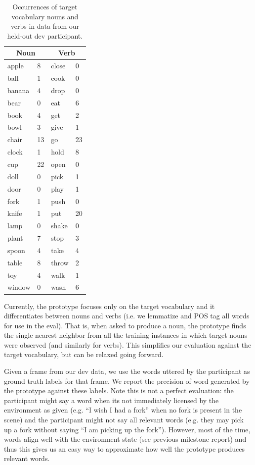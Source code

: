 \documentclass[11pt]{article}
\begin{document}
\begin{table}[ht!]
\centering
\begin{tabular}{|ll|ll|}
\hline
\multicolumn{2}{|c}{Noun} & \multicolumn{2}{|c|}{Verb} \\
\hline
apple	&	8	&	close	&	0	\\
ball	&	1	&	cook	&	0	\\
banana	&	4	&	drop	&	0	\\
bear	&	0	&	eat	&	6	\\
book	&	4	&	get	&	2	\\
bowl	&	3	&	give	&	1	\\
chair	&	13	&	go	&	23	\\
clock	&	1	&	hold	&	8	\\
cup	&	22	&	open	&	0	\\
doll	&	0	&	pick	&	1	\\
door	&	0	&	play	&	1	\\
fork	&	1	&	push	&	0	\\
knife	&	1	&	put	&	20	\\
lamp	&	0	&	shake	&	0	\\
plant	&	7	&	stop	&	3	\\
spoon	&	4	&	take	&	4	\\
table	&	8	&	throw	&	2	\\
toy	&	4	&	walk	&	1	\\
window	&	0	&	wash	&	6	\\
\hline
\end{tabular}
\caption{Occurrences of target vocabulary nouns and verbs in data from our held-out dev participant.}
\label{tab:dev_coverage}
\end{table}

Currently, the prototype focuses only on the target vocabulary and it differentiates between nouns and verbs (i.e. we lemmatize and POS tag all words for use in the eval). That is, when asked to produce a noun, the prototype finds the single nearest neighbor from all the training instances in which target nouns were observed (and similarly for verbs). This simplifies our evaluation against the target vocabulary, but can be relaxed going forward. 

Given a frame from our dev data, we use the words uttered by the participant as ground truth labels for that frame. We report the precision of word generated by the prototype against these labels. Note this is not a perfect evaluation: the participant might say a word when its not immediately licensed by the environment as given (e.g. ``I wish I had a fork'' when no fork is present in the scene) and the participant might not say all relevant words (e.g. they may pick up a fork without saying ``I am picking up the fork''). However, most of the time, words align well with the environment state (see previous milestone report) and thus this gives us an easy way to approximate how well the prototype produces relevant words.
\end{document}
